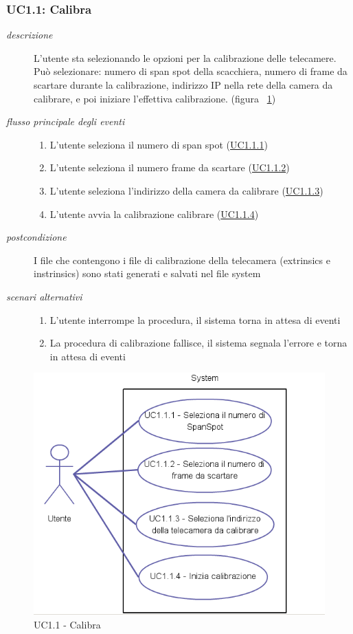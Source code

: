 \subsubsection{UC1.1: Calibra} \label{sec:UC1.1}
\begin{description}
\item[\em{descrizione }]L'utente sta selezionando le opzioni per la calibrazione delle telecamere. Può selezionare: numero di span spot della scacchiera, numero di frame da scartare durante la calibrazione, indirizzo IP nella rete della camera da calibrare, e poi iniziare l'effettiva calibrazione. (figura ~\ref{fig:uc1.1})
\item[\em{flusso principale degli eventi }] \mbox{}
\begin{enumerate}
\item L'utente seleziona il numero di span spot (\hyperref[sec:uc1.1.1]{UC1.1.1})
\item L'utente seleziona il numero frame da scartare (\hyperref[sec:uc1.1.2]{UC1.1.2})
\item L'utente seleziona l'indirizzo della camera da calibrare (\hyperref[sec:uc1.1.3]{UC1.1.3})
\item L'utente avvia la calibrazione calibrare (\hyperref[sec:uc1.1.4]{UC1.1.4})
\end{enumerate}
\item[\em{postcondizione }] I file che contengono i file di calibrazione della telecamera (extrinsics e instrinsics) sono stati generati e salvati nel file system
\item[\em{scenari alternativi }] \mbox{} 
\begin{enumerate} 
\item L'utente interrompe la procedura, il sistema torna in attesa di eventi
\item La procedura di calibrazione fallisce, il sistema segnala l'errore e torna in attesa di eventi
\end{enumerate}
\end{description}

\begin{figure}[htpb] 
\centering 
\includegraphics[scale=0.4]{./images/uc11.png} 
\caption{UC1.1 - Calibra} 
\label{fig:uc1.1}
\end{figure} 

